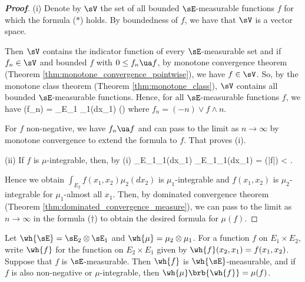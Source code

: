 \begin{proof}[\bf Proof]
\ben
\item [(i)] Denote by $\sV$ the set of all bounded $\sE$-measurable functions $f$ for which the formula ($*$) holds. By boundedness of $f$, we have that $\sV$ is a vector space.

Then $\sV$ contains the indicator function of every $\sE$-measurable set and if $f_n \in \sV$ and bounded $f$ with $0\leq f_n\ua f$, by monotone convergence theorem (Theorem \ref{thm:monotone_convergence_pointwise}), we have $f\in \sV$. So, by the monotone class theorem (Theorem \ref{thm:monotone_class}), $\sV$ contains all bounded $\sE$-measurable functions. Hence, for all $\sE$-measurable functions $f$, we have
\be
\mu(f_n) = \int_{E_1} \mu_1(dx_1) \quad\quad (\dag)
\ee
where $f_n = (-n) \lor f \land n$.

For $f$ non-negative, we have $f_n \ua f$ and can pass to the limit as $n \to \infty$ by monotone convergence to extend the formula to $f$. That proves (i).

\item [(ii)] If $f$ is $\mu$-integrable, then, by (i)
\be
\int_{E_1}\mu_1(dx_1) \leq \int_{E_1}\mu_1(dx_1) = \mu(|f|) < \infty.
\ee

Hence we obtain $\int_{E_2} f(x_1, x_2)\mu_2(dx_2)$ is $\mu_1$-integrable and $f(x_1, x_2)$ is $\mu_2$-integrable for $\mu_1$-almost all $x_1$. Then, by dominated convergence theorem (Theorem \ref{thm:dominated_convergence_measure}), we can pass to the limit as $n \to \infty$ in the formula ($\dag$) to obtain the desired formula for $\mu(f)$.
\een
\end{proof}

\begin{proposition}\label{pro:product_measure}
Let $\wh{\sE} = \sE_2 \otimes \sE_1$ and $\wh{\mu} = \mu_2 \otimes \mu_1$. For a function $f$ on $E_1 \times E_2$, write $\wh{f}$ for the function on $E_2 \times E_1$ given by $\wh{f}(x_2, x_1) = f(x_1, x_2)$. Suppose that $f$ is $\sE$-measurable. Then $\wh{f}$ is $\wh{\sE}$-measurable, and if $f$ is also non-negative or $\mu$-integrable, then $\wh{\mu}\brb{\wh{f}} = \mu(f)$.
\end{proposition}

